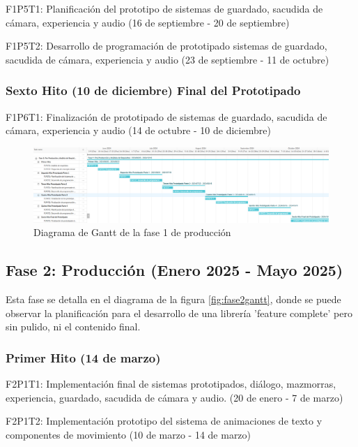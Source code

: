 \begin{compactitem}
\item F1P5T1: Planificación del prototipo de sistemas de guardado, sacudida de cámara, experiencia y audio (16 de septiembre - 20 de septiembre)
\item F1P5T2: Desarrollo de programación de prototipado sistemas de guardado, sacudida de cámara, experiencia y audio (23 de septiembre - 11 de octubre)
\end{compactitem}

\subsubsection{Sexto Hito (10 de diciembre) Final del Prototipado}

\begin{compactitem}
\item F1P6T1: Finalización de prototipado de sistemas de guardado, sacudida de cámara, experiencia y audio (14 de octubre - 10 de diciembre)
\end{compactitem}


\begin{figure}[H]
  \centering
	\includegraphics[width=450px,clip=true]{gant1.png}
  \caption{Diagrama de Gantt de la fase 1 de producción}
  \label{fig:fase1gantt}
\end{figure}

\subsection{Fase 2: Producción (Enero 2025 - Mayo 2025)}

Esta fase se detalla en el diagrama de la figura \ref{fig:fase2gantt}, donde se puede observar la planificación para el desarrollo de una librería 
'feature complete' pero sin pulido, ni el contenido final.

\subsubsection{Primer Hito (14 de marzo)}

\begin{compactitem}
\item F2P1T1: Implementación final de sistemas prototipados, diálogo, mazmorras, experiencia, guardado, sacudida de cámara y audio. (20 de enero - 7 de marzo)
\item F2P1T2: Implementación prototipo del sistema de animaciones de texto y componentes de movimiento (10 de marzo - 14 de marzo)
\end{compactitem}

